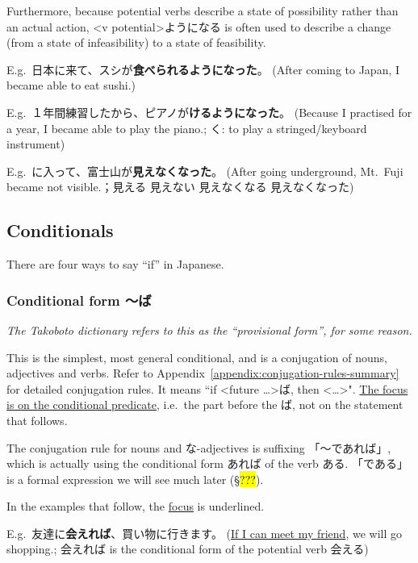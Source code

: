 \documentclass[../nihongo-gakushuu-kyouzai.tex]{subfiles}
\begin{document}
Furthermore, because potential verbs describe a state of possibility rather than an actual action, <v potential>ようになる is often used to describe a change (from a state of infeasibility) to a state of feasibility.

E.g.\ 日本に来て、スシが\textbf{食べられるようになった}。 (After coming to Japan, I became able to eat sushi.)

E.g.\ １年間練習したから、ピアノが\textbf{けるようになった}。 (Because I practised for a year, I became able to play the piano.; く: to play a stringed/keyboard instrument)


E.g.\ に入って、富士山が\textbf{見えなくなった}。 (After going underground, Mt.~Fuji became not visible.；見える \to{} 見えない \to{} 見えなくなる \to{} 見えなくなった)


\subsection{Conditionals} \label{sec:conditions}
There are four ways to say ``if'' in Japanese.

\subsubsection{Conditional form 〜ば} \label{sec:conditional-form}
\emph{The Takoboto dictionary refers to this as the ``provisional form'', for some reason.}

This is the simplest, most general conditional, and is a conjugation of nouns, adjectives and verbs. Refer to Appendix~\ref{appendix:conjugation-rules-summary} for detailed conjugation rules. It means ``if <future \dots>ば, then <\dots>". \ul{The focus is on the conditional predicate}, i.e.\ the part before the ば, not on the statement that follows.

The conjugation rule for nouns and な-adjectives is suffixing 「〜であれば」, which is actually using the conditional form あれば of the verb ある. 「である」 is a formal expression we will see much later (\S\hl{???}).

In the examples that follow, the \ul{focus} is underlined.

E.g.\ 友達に\textbf{会えれば}、買い物に行きます。 (\ul{If I can meet my friend}, we will go shopping.; 会えれば is the conditional form of the potential verb 会える)
\end{document}
